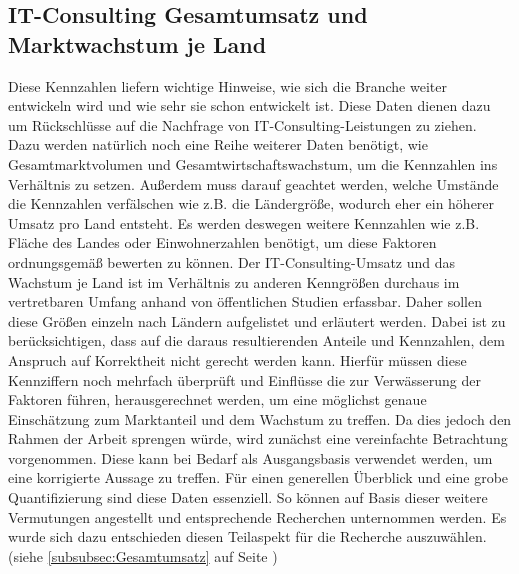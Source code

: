  \subsection*{IT-Consulting Gesamtumsatz und Marktwachstum je Land}
 Diese Kennzahlen liefern wichtige Hinweise, wie sich die Branche weiter entwickeln wird und wie sehr sie schon entwickelt ist. 
 Diese Daten dienen dazu um Rückschlüsse auf die Nachfrage von IT-Consulting-Leistungen zu ziehen. 
 Dazu werden natürlich noch eine Reihe weiterer Daten benötigt, wie Gesamtmarktvolumen und Gesamtwirtschaftswachstum, um die Kennzahlen ins Verhältnis zu setzen.
  Außerdem muss darauf geachtet werden, welche Umstände die Kennzahlen verfälschen wie z.B. die Ländergröße, wodurch eher ein höherer Umsatz pro Land entsteht. 
  Es werden deswegen weitere Kennzahlen wie z.B. Fläche des Landes oder Einwohnerzahlen benötigt, um diese Faktoren ordnungsgemäß bewerten zu können.
 Der IT-Consulting-Umsatz und das Wachstum je Land ist im Verhältnis zu anderen Kenngrößen durchaus im vertretbaren Umfang anhand von öffentlichen Studien erfassbar.  
 Daher sollen diese Größen einzeln nach Ländern aufgelistet und erläutert werden. 
  Dabei ist zu berücksichtigen, dass auf die daraus resultierenden Anteile und Kennzahlen, dem Anspruch auf Korrektheit nicht gerecht werden kann. 
  Hierfür müssen diese Kennziffern noch mehrfach überprüft und Einflüsse die zur Verwässerung der Faktoren führen, herausgerechnet werden, um eine möglichst genaue Einschätzung zum Marktanteil und dem Wachstum zu treffen. Da dies jedoch den Rahmen der Arbeit sprengen würde, wird zunächst eine vereinfachte Betrachtung vorgenommen. Diese kann bei Bedarf als Ausgangsbasis  verwendet werden, um eine korrigierte Aussage zu treffen. 
  Für einen generellen Überblick und eine grobe Quantifizierung sind diese Daten essenziell. So können auf Basis dieser weitere Vermutungen angestellt und entsprechende Recherchen unternommen werden.
 Es wurde sich dazu entschieden diesen Teilaspekt für die Recherche auszuwählen. (siehe  \ref{subsubsec:Gesamtumsatz}  auf Seite \pageref{subsubsec:Gesamtumsatz})
 
